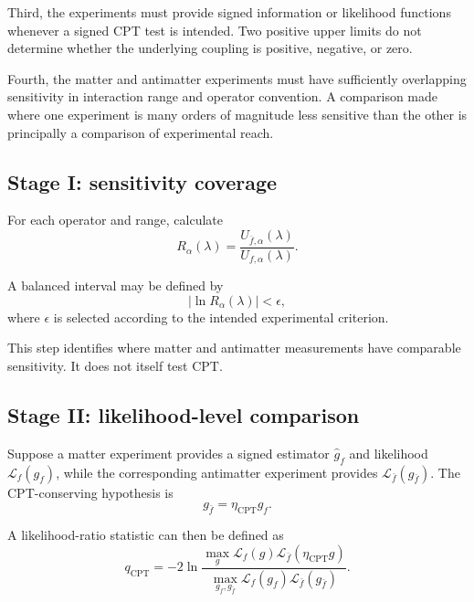\documentclass[aps,prd,reprint,superscriptaddress,nofootinbib]{revtex4-2}
\newcommand{\CPT}{\mathrm{CPT}}
\begin{document}
	Third, the experiments must provide signed information or likelihood
	functions whenever a signed CPT test is intended. Two positive upper
	limits do not determine whether the underlying coupling is positive,
	negative, or zero.
	
	Fourth, the matter and antimatter experiments must have sufficiently
	overlapping sensitivity in interaction range and operator convention.
	A comparison made where one experiment is many orders of magnitude
	less sensitive than the other is principally a comparison of
	experimental reach.
	
	\subsection{Stage I: sensitivity coverage}
	
	For each operator and range, calculate
	\begin{equation}
		R_\alpha(\lambda)
		=
		\frac{U_{\bar f,\alpha}(\lambda)}
		{U_{f,\alpha}(\lambda)}.
	\end{equation}
	
	A balanced interval may be defined by
	\begin{equation}
		|\ln R_\alpha(\lambda)|<\epsilon,
		\label{eq:balanced}
	\end{equation}
	where $\epsilon$ is selected according to the intended experimental
	criterion.
	
	This step identifies where matter and antimatter measurements have
	comparable sensitivity. It does not itself test CPT.
	
	\subsection{Stage II: likelihood-level comparison}
	
	Suppose a matter experiment provides a signed estimator $\hat g_f$ and
	likelihood $\mathcal L_f(g_f)$, while the corresponding antimatter
	experiment provides $\mathcal L_{\bar f}(g_{\bar f})$. The
	CPT-conserving hypothesis is
	\begin{equation}
		g_{\bar f}=\eta_\CPT g_f.
	\end{equation}
	
	A likelihood-ratio statistic can then be defined as
	\begin{equation}
		q_\CPT
		=
		-2\ln
		\frac{
			\displaystyle
			\max_g
			\mathcal L_f(g)
			\mathcal L_{\bar f}(\eta_\CPT g)
		}{
			\displaystyle
			\max_{g_f,g_{\bar f}}
			\mathcal L_f(g_f)
			\mathcal L_{\bar f}(g_{\bar f})
		}.
		\label{eq:likelihoodratio}
	\end{equation}
	
\end{document}
